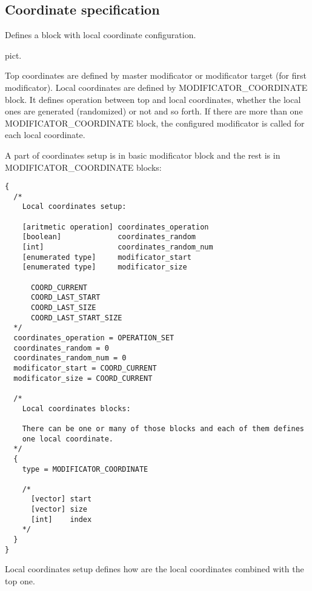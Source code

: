 \documentclass[9pt]{article}
\begin{document}
\subsection{Coordinate specification}

Defines a block with local coordinate configuration.

pict.

Top coordinates are defined by master modificator or modificator target
(for first modificator). Local coordinates are defined by MODIFICATOR\_COORDINATE
block. It defines operation between top and local coordinates, whether the local
ones are generated (randomized) or not and so forth. If there are more than one
MODIFICATOR\_COORDINATE block, the configured modificator is called for each local
coordinate.

A part of coordinates setup is in basic modificator block and the rest 
is in MODIFICATOR\_COORDINATE blocks:
\begin{verbatim}
{
  /*
    Local coordinates setup:
    
    [aritmetic operation] coordinates_operation 
    [boolean]             coordinates_random
    [int]                 coordinates_random_num
    [enumerated type]     modificator_start
    [enumerated type]     modificator_size
            
      COORD_CURRENT
      COORD_LAST_START
      COORD_LAST_SIZE
      COORD_LAST_START_SIZE      
  */  
  coordinates_operation = OPERATION_SET
  coordinates_random = 0
  coordinates_random_num = 0
  modificator_start = COORD_CURRENT
  modificator_size = COORD_CURRENT
  
  /*
    Local coordinates blocks:
    
    There can be one or many of those blocks and each of them defines
    one local coordinate.
  */
  {
    type = MODIFICATOR_COORDINATE
    
    /*
      [vector] start
      [vector] size
      [int]    index
    */
  }
}
\end{verbatim}
Local coordinates setup defines how are the local 
coordinates combined with the top one.
\end{document}
